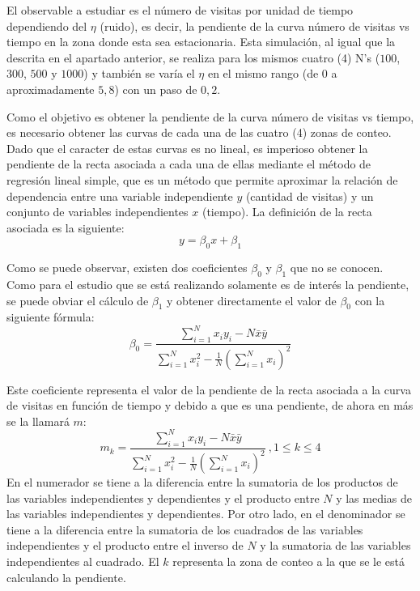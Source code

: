 \documentclass[11pt, a4paper]{article}
\begin{document}
            El observable a estudiar es el número de visitas por unidad de tiempo dependiendo del $\eta$ (ruido), es decir,
            la pendiente de la curva número de visitas vs tiempo en la zona donde esta sea estacionaria.
            Esta simulación, al igual que la descrita en el apartado anterior, se realiza para los mismos cuatro (4) N's
            ($100$, $300$, $500$ y $1000$) y también se varía el $\eta$ en el mismo rango (de $0$ a aproximadamente $5,8$)
            con un paso de $0,2$.

            Como el objetivo es obtener la pendiente de la curva número de visitas vs tiempo, es necesario obtener las curvas
            de cada una de las cuatro (4) zonas de conteo. Dado que el caracter de estas curvas es no lineal, es imperioso
            obtener la pendiente de la recta asociada a cada una de ellas mediante el método de regresión lineal simple, que
            es un método que permite aproximar la relación de dependencia entre una variable independiente $y$ (cantidad de visitas)
            y un conjunto de variables independientes $x$ (tiempo). La definición de la recta asociada es la siguiente:
            \begin{equation}
                y = \beta_0 x + \beta_1
            \end{equation}

            Como se puede observar, existen dos coeficientes $\beta_0$ y $\beta_1$ que no se conocen. Como para el estudio que se
            está realizando solamente es de interés la pendiente, se puede obviar el cálculo de $\beta_1$ y obtener directamente
            el valor de $\beta_0$ con la siguiente fórmula:
            \begin{equation}
                \beta_0 = \frac{\sum_{i=1}^N x_i y_i - N\bar{x} \bar{y}}{\sum_{i=1}^N x_i^2 - \frac{1}{N} \left(\sum_{i=1}^N x_i \right)^2}
            \end{equation}

            Este coeficiente representa el valor de la pendiente de la recta asociada a la curva de visitas en función de tiempo y
            debido a que es una pendiente, de ahora en más se la llamará $m$:
            \begin{equation}
                m_k = \frac{\sum_{i=1}^N x_i y_i - N\bar{x} \bar{y}}{\sum_{i=1}^N x_i^2 - \frac{1}{N} \left(\sum_{i=1}^N x_i \right)^2}
                \ , 1 \leq k \leq 4
            \end{equation}
            En el numerador se tiene a la diferencia entre la sumatoria de los productos de las variables independientes y dependientes
            y el producto entre $N$ y las medias de las variables independientes y dependientes.
            Por otro lado, en el denominador se tiene a la diferencia entre la sumatoria de los cuadrados de las variables independientes
            y el producto entre el inverso de $N$ y la sumatoria de las variables independientes al cuadrado. El $k$ representa la zona
            de conteo a la que se le está calculando la pendiente.
\end{document}
